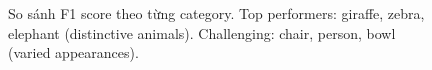 \begin{figure}[H]
    \centering
    \caption{So sánh F1 score theo từng category. Top performers: giraffe, zebra, elephant (distinctive animals). Challenging: chair, person, bowl (varied appearances).}
    \label{fig:per-class-f1}
\end{figure}

%
